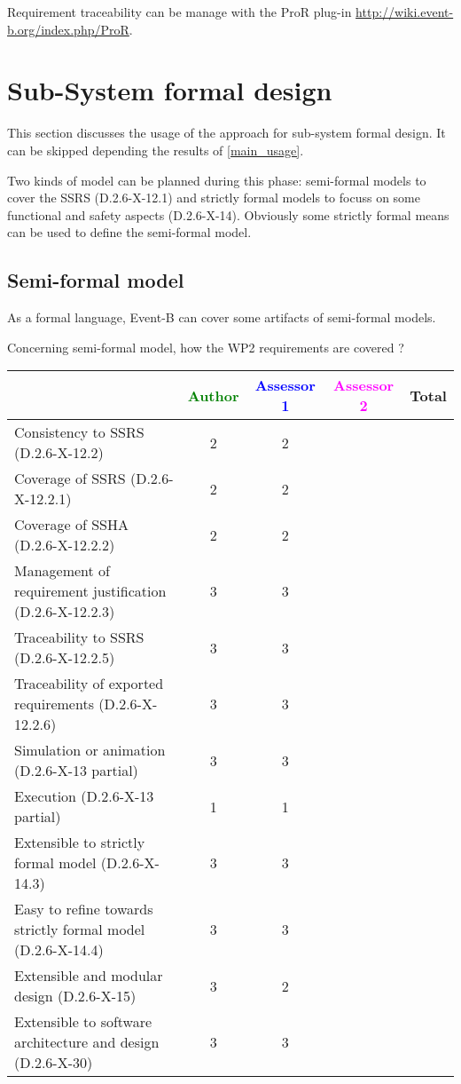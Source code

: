 \begin{author_comment}
Requirement traceability can be manage with the ProR plug-in \url{http://wiki.event-b.org/index.php/ProR}.
\end{author_comment}

\section{Sub-System formal design}
This section discusses the usage of the approach for sub-system formal design.
It can be skipped depending the results of \ref{main_usage}.

Two kinds of model can be planned during this phase: semi-formal models to  cover the SSRS (D.2.6-X-12.1) and strictly formal  models to  focuss on some functional and safety aspects (D.2.6-X-14).  Obviously some strictly  formal means can be used to define the semi-formal  model.

\subsection{Semi-formal model}


\begin{author_comment}
As a formal language, Event-B  can cover some artifacts of semi-formal models.
\end{author_comment}

Concerning semi-formal model, how the WP2 requirements are covered ?

\begin{tabular}{|l | c | c | c | c|}
\hline
& \textcolor{green}{Author} & \textcolor{blue}{Assessor 1} & \textcolor{magenta}{Assessor 2} & Total \\
\hline 
Consistency to SSRS (D.2.6-X-12.2) & 2 & 2 & &  \\
\hline
Coverage of SSRS (D.2.6-X-12.2.1)  & 2 & 2 & &  \\
\hline
Coverage of SSHA (D.2.6-X-12.2.2)  & 2 & 2 & &  \\
\hline
Management of requirement justification (D.2.6-X-12.2.3)  & 3 & 3 & &  \\
\hline
Traceability to  SSRS (D.2.6-X-12.2.5)  & 3 & 3 & &  \\
\hline
Traceability of exported requirements (D.2.6-X-12.2.6)  & 3 & 3 & &  \\
\hline
Simulation or animation (D.2.6-X-13 partial)  & 3 & 3 & &  \\
\hline
Execution (D.2.6-X-13 partial)  & 1 & 1 & &  \\
\hline
Extensible to strictly formal model (D.2.6-X-14.3) & 3 & 3 & &  \\
\hline
Easy to  refine towards strictly formal model (D.2.6-X-14.4) & 3 & 3 & &  \\
\hline
Extensible and modular design (D.2.6-X-15)  & 3 & 2 & &  \\
\hline
Extensible to software architecture and design (D.2.6-X-30)   & 3 & 3 & &  \\
\hline
\end{tabular}


